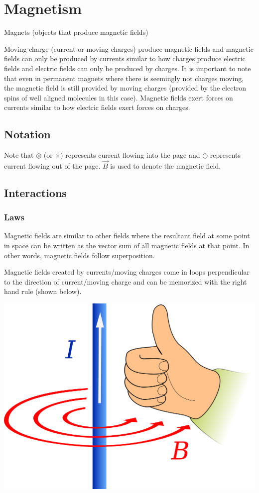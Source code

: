 \chapter{Magnetism}

Magnets (objects that produce magnetic fields) 

Moving charge (current or moving charges) produce magnetic fields and magnetic fields can only be produced by currents similar to how charges produce electric fields and electric fields can only be produced by charges. It is important to note that even in permanent magnets where there is seemingly not charges moving, the magnetic field is still provided by moving charges (provided by the electron spins of well aligned molecules in this case). Magnetic fields exert forces on currents similar to how electric fields exert forces on charges.

\section{Notation}

Note that $\otimes$ (or $\times$) represents current flowing into the page and $\odot$ represents current flowing out of the page. $\vec{B}$ is used to denote the magnetic field.

\section{Interactions}

\subsection{Laws}

Magnetic fields are similar to other fields where the resultant field at some point in space can be written as the vector sum of all magnetic fields at that point. In other words, magnetic fields follow superposition.

Magnetic fields created by currents/moving charges come in loops perpendicular to the direction of current/moving charge and can be memorized with the right hand rule (shown below).

\hfil \includegraphics[scale=0.05]{assets/current-rhr.png}

